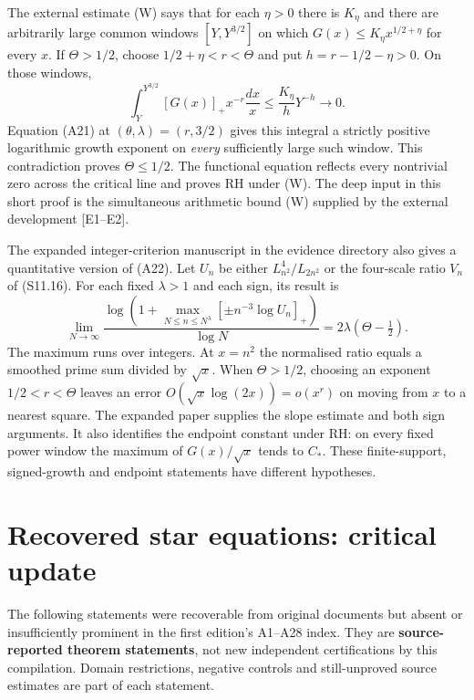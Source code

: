 \documentclass[
  10pt,
  a4paper,
  10pt,
  oneside,
  openany]{book}
\begin{document}
The external estimate (W) says that for each \(\eta>0\) there is
\(K_\eta\) and there are arbitrarily large common windows
\([Y,Y^{3/2}]\) on which \(G(x)\le K_\eta x^{1/2+\eta}\) for every
\(x\). If \(\Theta>1/2\), choose \(1/2+\eta<r<\Theta\) and put
\(h=r-1/2-\eta>0\). On those windows, \[
 \int_Y^{Y^{3/2}}[G(x)]_+x^{-r}\frac{dx}{x}
 \le \frac{K_\eta}{h}Y^{-h}\longrightarrow0.
 \tag{A27}\label{eq:A27}
\] Equation (A21) at \((\theta,\lambda)=(r,3/2)\) gives this integral a
strictly positive logarithmic growth exponent on \emph{every}
sufficiently large such window. This contradiction proves
\(\Theta\le1/2\). The functional equation reflects every nontrivial zero
across the critical line and proves RH under (W). The deep input in this
short proof is the simultaneous arithmetic bound (W) supplied by the
external development {[}E1--E2{]}.

The expanded integer-criterion manuscript in the evidence directory also
gives a quantitative version of (A22). Let \(U_n\) be either
\(L_{n^2}^4/L_{2n^2}\) or the four-scale ratio \(V_n\) of (S11.16). For
each fixed \(\lambda>1\) and each sign, its result is \[
 \lim_{N\to\infty}
 \frac{\log\!\left(1+\max_{N\le n\le N^\lambda}
                 [\pm n^{-3}\log U_n]_+\right)}{\log N}
       =2\lambda(\Theta-\tfrac12).
 \tag{A28}\label{eq:A28}
\] The maximum runs over integers. At \(x=n^2\) the normalised ratio
equals a smoothed prime sum divided by \(\sqrt x\). When \(\Theta>1/2\),
choosing an exponent \(1/2<r<\Theta\) leaves an error
\(O(\sqrt x\log(2x))=o(x^r)\) on moving from \(x\) to a nearest square.
The expanded paper supplies the slope estimate and both sign arguments.
It also identifies the endpoint constant under RH: on every fixed power
window the maximum of \(G(x)/\sqrt x\) tends to \(C_*\). These
finite-support, signed-growth and endpoint statements have different
hypotheses.

\section{Recovered star equations: critical
update}\label{atlas-recovered-star-equations}

The following statements were recoverable from original documents but
absent or insufficiently prominent in the first edition's A1--A28 index.
They are \textbf{source-reported theorem statements}, not new
independent certifications by this compilation. Domain restrictions,
negative controls and still-unproved source estimates are part of each
statement.
\end{document}
